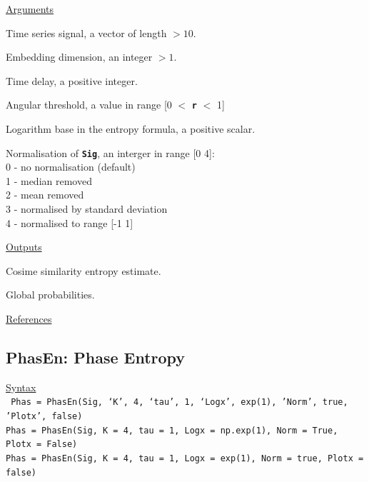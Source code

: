\documentclass[12pt, a4paper, titlepage, openany]{book}
\begin{document}
\noindent \ul{Arguments}
\begin{description}[labelsep=1cm, labelwidth=2cm, nosep, style=multiline,leftmargin=3cm]\footnotesize
\item[\texttt{Sig}]		Time series signal, a vector of length $> 10$.
\item[\texttt{m}]		Embedding dimension, an integer $> 1$.
\item[\texttt{tau}]		Time delay, a positive integer.
\item[\texttt{r}]		Angular threshold, a value in range [0 $<$ \texttt{\textbf{r}} $<$ 1]
\item[\texttt{Logx}]	Logarithm base in the entropy formula, a positive scalar.
\item[\texttt{Norm}]	Normalisation of \texttt{\textbf{Sig}}, an interger in range [0 4]:\\
						0 - no normalisation (default)\\
						1 - median removed\\
						2 - mean removed\\
						3 - normalised by standard deviation\\
						4 - normalised to range [-1 1]
\end{description}

\noindent \ul{Outputs}
\begin{description}[labelsep=1cm, labelwidth=2cm, nosep, style=multiline,leftmargin=3cm]\footnotesize
\item[\texttt{CoSi}]	Cosime similarity entropy  estimate.
\item[\texttt{Bm}]	Global probabilities.
\end{description}

\noindent \ul{References}\hspace{1cm}
\cite{CoSi1}



\newpage
\subsection{\normalsize PhasEn: \hspace{15mm} Phase Entropy}
\noindent\ul{Syntax} \vspace{6mm} \\ \noindent \texttt{\footnotesize
Phas = PhasEn(Sig, ‘K’, 4, ‘tau’, 1, ‘Logx’, exp(1), 'Norm', true, 'Plotx', false) \\
Phas = PhasEn(Sig, K = 4, tau = 1, Logx = np.exp(1), Norm = True, Plotx = False) \\
Phas = PhasEn(Sig, K = 4, tau = 1, Logx = exp(1), Norm = true, Plotx = false)}
\end{document}
